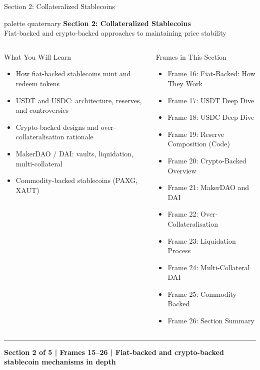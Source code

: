 \documentclass[8pt,aspectratio=169]{beamer}
\newcommand{\bottomnote}[1]{\vfill\vspace{-2mm}\textcolor{mllavender2}{\rule{\textwidth}{0.4pt}}\vspace{1mm}\footnotesize\textbf{#1}}
\begin{document}
\begin{frame}{Section 2: Collateralized Stablecoins}
\begin{beamercolorbox}[sep=12pt,center,rounded=true,shadow=true]{palette quaternary}
  {\Large\bfseries Section 2: Collateralized Stablecoins}\\[4pt]
  {\normalsize Fiat-backed and crypto-backed approaches to maintaining price stability}
\end{beamercolorbox}

\vspace{4mm}
\begin{columns}[T]
\begin{block}{What You Will Learn}
\begin{itemize}\setlength{\itemsep}{2pt}
  \item How fiat-backed stablecoins mint and redeem tokens
  \item USDT and USDC: architecture, reserves, and controversies
  \item Crypto-backed designs and over-collateralisation rationale
  \item MakerDAO / DAI: vaults, liquidation, multi-collateral
  \item Commodity-backed stablecoins (PAXG, XAUT)
\end{itemize}
\end{block}
\begin{block}{Frames in This Section}
\begin{itemize}\setlength{\itemsep}{2pt}
  \item Frame 16: Fiat-Backed: How They Work
  \item Frame 17: USDT Deep Dive
  \item Frame 18: USDC Deep Dive
  \item Frame 19: Reserve Composition (Code)
  \item Frame 20: Crypto-Backed Overview
  \item Frame 21: MakerDAO and DAI
  \item Frame 22: Over-Collateralisation
  \item Frame 23: Liquidation Process
  \item Frame 24: Multi-Collateral DAI
  \item Frame 25: Commodity-Backed
  \item Frame 26: Section Summary
\end{itemize}
\end{block}
\end{columns}
\bottomnote{Section 2 of 5 | Frames 15--26 | Fiat-backed and crypto-backed stablecoin mechanisms in depth}
\end{frame}
\end{document}
